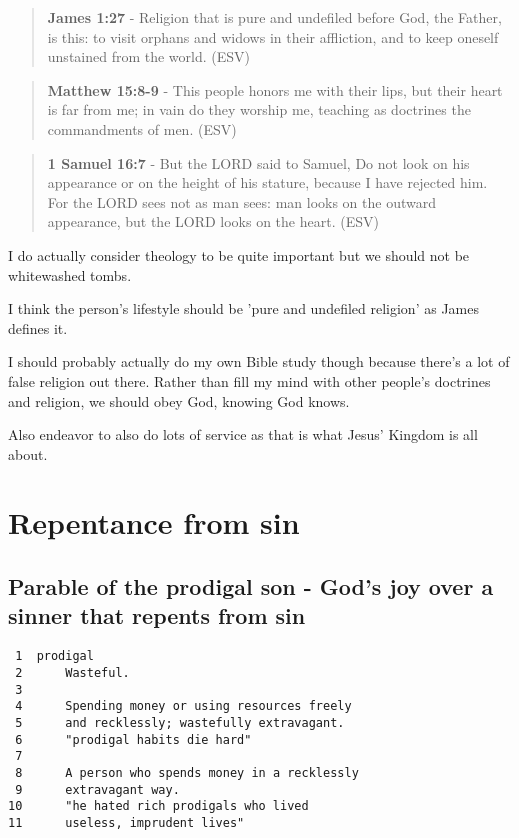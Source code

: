 \documentclass[11pt]{article}
\begin{document}
\begin{quote}
\textbf{James 1:27} - Religion that is pure and undefiled before God, the Father, is this: to visit orphans and widows in their affliction, and to keep oneself unstained from the world. (ESV)
\end{quote}

\begin{quote}
\textbf{Matthew 15:8-9} - This people honors me with their lips, but their heart is far from me; in vain do they worship me, teaching as doctrines the commandments of men. (ESV)
\end{quote}

\begin{quote}
\textbf{1 Samuel 16:7} - But the LORD said to Samuel, Do not look on his appearance or on the height of his stature, because I have rejected him.  For the LORD sees not as man sees: man looks on the outward appearance, but the LORD looks on the heart.  (ESV)
\end{quote}

I do actually consider theology to be quite important but we should not be whitewashed tombs.

I think the person's lifestyle should be 'pure and undefiled religion' as James defines it.

I should probably actually do my own Bible study though because there's a lot of false religion out there.
Rather than fill my mind with other people's doctrines and religion, we should obey God, knowing God knows.

Also endeavor to also do lots of service as that is what Jesus' Kingdom is all about.

\section{Repentance from sin}
\label{sec:org8c72b34}
\subsection{Parable of the prodigal son - God's joy over a sinner that repents from sin}
\label{sec:orgb4afa9e}
\begin{verbatim}
 1  prodigal
 2      Wasteful.
 3  
 4      Spending money or using resources freely
 5      and recklessly; wastefully extravagant.
 6      "prodigal habits die hard"
 7  
 8      A person who spends money in a recklessly
 9      extravagant way.
10      "he hated rich prodigals who lived
11      useless, imprudent lives"
\end{verbatim}
\end{document}
